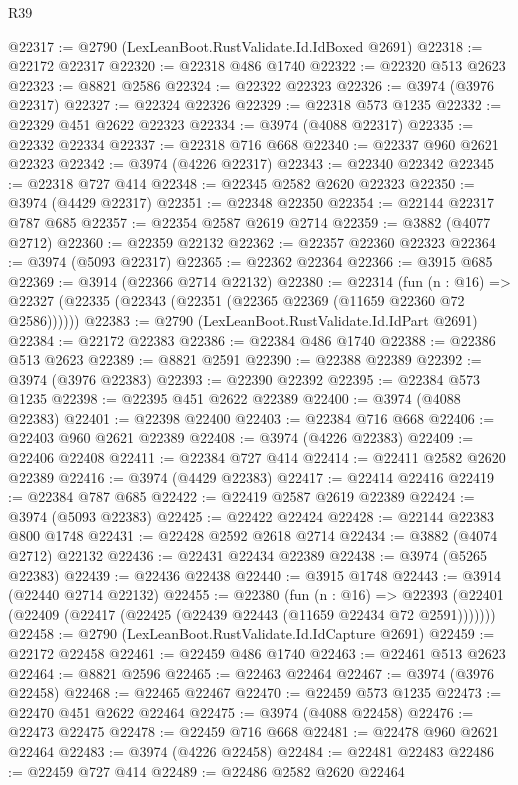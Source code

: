 \begin{lexlean}{R39}
\begin{coremodule}
@22317 := @2790 (LexLeanBoot.RustValidate.Id.IdBoxed @2691)
@22318 := @22172 @22317
@22320 := @22318 @486 @1740
@22322 := @22320 @513 @2623
@22323 := @8821 @2586
@22324 := @22322 @22323
@22326 := @3974 (@3976 @22317)
@22327 := @22324 @22326
@22329 := @22318 @573 @1235
@22332 := @22329 @451 @2622 @22323
@22334 := @3974 (@4088 @22317)
@22335 := @22332 @22334
@22337 := @22318 @716 @668
@22340 := @22337 @960 @2621 @22323
@22342 := @3974 (@4226 @22317)
@22343 := @22340 @22342
@22345 := @22318 @727 @414
@22348 := @22345 @2582 @2620 @22323
@22350 := @3974 (@4429 @22317)
@22351 := @22348 @22350
@22354 := @22144 @22317 @787 @685
@22357 := @22354 @2587 @2619 @2714
@22359 := @3882 (@4077 @2712)
@22360 := @22359 @22132
@22362 := @22357 @22360 @22323
@22364 := @3974 (@5093 @22317)
@22365 := @22362 @22364
@22366 := @3915 @685
@22369 := @3914 (@22366 @2714 @22132)
@22380 := @22314
    (fun (n : @16) => @22327 (@22335 (@22343 (@22351 (@22365 @22369 (@11659 @22360 @72 @2586))))))
@22383 := @2790 (LexLeanBoot.RustValidate.Id.IdPart @2691)
@22384 := @22172 @22383
@22386 := @22384 @486 @1740
@22388 := @22386 @513 @2623
@22389 := @8821 @2591
@22390 := @22388 @22389
@22392 := @3974 (@3976 @22383)
@22393 := @22390 @22392
@22395 := @22384 @573 @1235
@22398 := @22395 @451 @2622 @22389
@22400 := @3974 (@4088 @22383)
@22401 := @22398 @22400
@22403 := @22384 @716 @668
@22406 := @22403 @960 @2621 @22389
@22408 := @3974 (@4226 @22383)
@22409 := @22406 @22408
@22411 := @22384 @727 @414
@22414 := @22411 @2582 @2620 @22389
@22416 := @3974 (@4429 @22383)
@22417 := @22414 @22416
@22419 := @22384 @787 @685
@22422 := @22419 @2587 @2619 @22389
@22424 := @3974 (@5093 @22383)
@22425 := @22422 @22424
@22428 := @22144 @22383 @800 @1748
@22431 := @22428 @2592 @2618 @2714
@22434 := @3882 (@4074 @2712) @22132
@22436 := @22431 @22434 @22389
@22438 := @3974 (@5265 @22383)
@22439 := @22436 @22438
@22440 := @3915 @1748
@22443 := @3914 (@22440 @2714 @22132)
@22455 := @22380
    (fun (n : @16) =>
    @22393 (@22401 (@22409 (@22417 (@22425 (@22439 @22443 (@11659 @22434 @72 @2591)))))))
@22458 := @2790 (LexLeanBoot.RustValidate.Id.IdCapture @2691)
@22459 := @22172 @22458
@22461 := @22459 @486 @1740
@22463 := @22461 @513 @2623
@22464 := @8821 @2596
@22465 := @22463 @22464
@22467 := @3974 (@3976 @22458)
@22468 := @22465 @22467
@22470 := @22459 @573 @1235
@22473 := @22470 @451 @2622 @22464
@22475 := @3974 (@4088 @22458)
@22476 := @22473 @22475
@22478 := @22459 @716 @668
@22481 := @22478 @960 @2621 @22464
@22483 := @3974 (@4226 @22458)
@22484 := @22481 @22483
@22486 := @22459 @727 @414
@22489 := @22486 @2582 @2620 @22464

\end{coremodule}
\end{lexlean}
